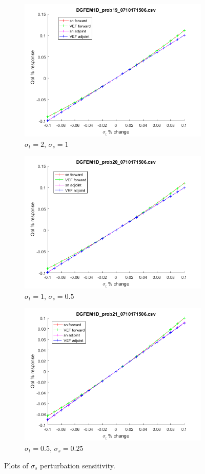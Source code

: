 \documentclass{article}
\newcommand{\sigt}{\sigma_t}
\newcommand{\sigs}{\sigma_s}
\begin{document}
\begin{figure}[H]
\label{HomoPerts}
\begin{subfigure}{.5\textwidth}
  \centering
  \includegraphics[width=.8\linewidth]{figures/19sigsSens.png}
  \caption{$\sigt=2$, $\sigs=1$}
  \label{fig:sfig1}
\end{subfigure}%
\begin{subfigure}{.5\textwidth}
  \centering
  \includegraphics[width=.8\linewidth]{figures/20sigsSens.png}
  \caption{$\sigt=1$, $\sigs=0.5$}
  \label{fig:sfig2}
\end{subfigure}
\begin{subfigure}{.5\textwidth}
  \centering
  \includegraphics[width=.8\linewidth]{figures/21sigsSens.png}
  \caption{$\sigt=0.5$, $\sigs=0.25$}
  \label{fig:sfig3}
\end{subfigure}
\caption{Plots of $\sigs$ perturbation sensitivity.}
\label{fig:fig}
\end{figure}
\end{document}
